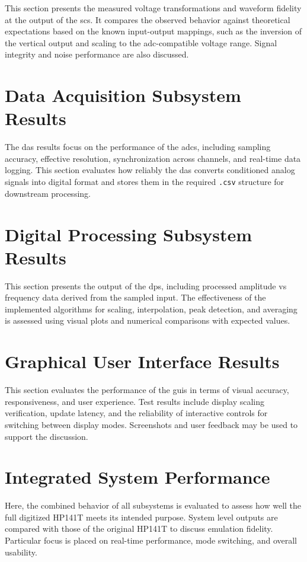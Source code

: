 \documentclass[class=report,11pt,crop=false]{standalone}
\begin{document}
	This section presents the measured voltage transformations and waveform fidelity at the output of the \acrshort{scs}. It compares the observed behavior against theoretical expectations based on the known input-output mappings, such as the inversion of the vertical output and scaling to the \acrshort{adc}-compatible voltage range. Signal integrity and noise performance are also discussed.
	
	\section{Data Acquisition Subsystem Results}
	
	The \acrshort{das} results focus on the performance of the \acrshort{adc}s, including sampling accuracy, effective resolution, synchronization across channels, and real-time data logging. This section evaluates how reliably the \acrshort{das} converts conditioned analog signals into digital format and stores them in the required \texttt{.csv} structure for downstream processing.
	
	\section{Digital Processing Subsystem Results}
	
	This section presents the output of the \acrshort{dps}, including processed amplitude vs frequency data derived from the sampled input. The effectiveness of the implemented algorithms for scaling, interpolation, peak detection, and averaging is assessed using visual plots and numerical comparisons with expected values.
	
	\section{Graphical User Interface Results}
	
	This section evaluates the performance of the \acrshort{guis} in terms of visual accuracy, responsiveness, and user experience. Test results include display scaling verification, update latency, and the reliability of interactive controls for switching between display modes. Screenshots and user feedback may be used to support the discussion.
	
	\section{Integrated System Performance}
	
	Here, the combined behavior of all subsystems is evaluated to assess how well the full digitized HP141T meets its intended purpose. System level outputs are compared with those of the original HP141T to discuss emulation fidelity. Particular focus is placed on real-time performance, mode switching, and overall usability.
	\ifstandalone
	
	\printnoidxglossary[type=\acronymtype,nonumberlist]
	\fi
\end{document}
